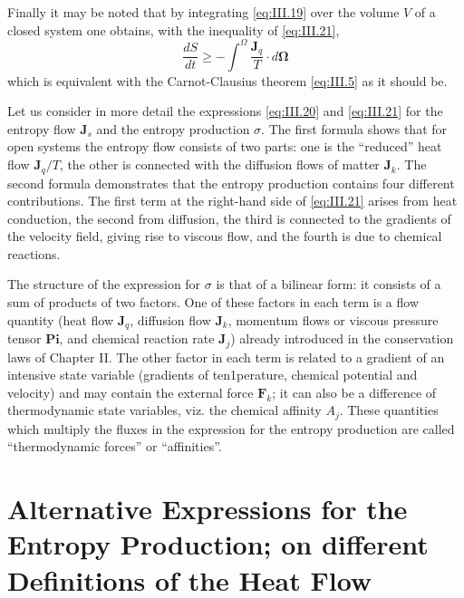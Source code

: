 Finally it may be noted that by integrating \eqref{eq:III.19} over the volume $V$ of a closed system one obtains, with the inequality of \eqref{eq:III.21},
\begin{equation}
\frac{d S}{d t} \geq - \int^{\Omega} \frac{\bm{J}_q}{T} \cdot d \bm{\Omega} 
    \label{eq:III.22}
\end{equation}
which is equivalent with the Carnot-Clausius theorem \eqref{eq:III.5} as it should be.

Let us consider in more detail the expressions \eqref{eq:III.20} and \eqref{eq:III.21} for the entropy flow $\bm{J}_s$ and the entropy production $\sigma$. The first formula shows that for open systems the entropy flow consists of two parts: one is the ``reduced'' heat flow $\bm{J}_q / T$, the other is connected with the diffusion
flows of matter $\bm{J}_k$. The second formula demonstrates that the entropy production contains four different contributions. The first term at the right-hand side of \eqref{eq:III.21} arises from heat conduction, the second from diffusion, the third is connected to the gradients of the velocity field, giving rise to viscous flow, and the fourth is due to chemical reactions.

The structure of the expression for $\sigma$ is that of a bilinear form: it consists of a sum of products of two factors. One of these factors in each term is a flow quantity (heat flow $\bm{J}_q$, diffusion flow $\bm{J}_k$, momentum flows or viscous pressure tensor $\bm{Pi}$, and chemical reaction rate $\bm{J}_j$) already introduced in the conservation laws of Chapter II. The other factor in each term is related to a gradient of an intensive state variable (gradients of ten1perature, chemical potential and velocity) and may contain the external force $\bm{F}_k$; it can also be a difference of thermodynamic state variables, viz. the chemical affinity $A_j$. These quantities
which multiply the fluxes in the expression for the entropy production are called ``thermodynamic forces'' or ``affinities''.

\section{Alternative Expressions for the Entropy Production; on different Definitions of the Heat Flow}

